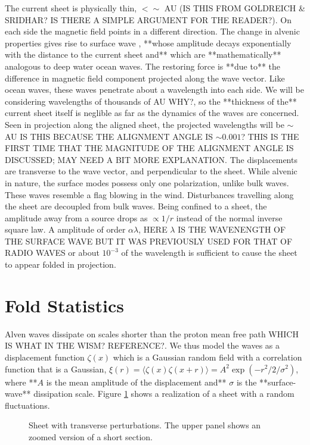 \documentclass[useAMS,usenatbib]{mn2e}
\begin{document}
The current sheet is physically thin, $< \sim $ AU (IS THIS FROM GOLDREICH \& SRIDHAR?
IS THERE A SIMPLE ARGUMENT FOR THE READER?).  On each side the
magnetic field points in a different direction.  The change in alvenic
properties gives rise to surface
wave \citep{1991SoPh..133..263J, 2009GApFD.103...89J}, **whose amplitude
decays exponentially with the distance to the current sheet and** which are
**mathematically** analogous to deep water ocean waves.  The restoring force is **due to** the
difference in magnetic field component projected along the wave
vector.  Like ocean waves, these waves penetrate about a wavelength
into each side.  We will be considering wavelengths of thousands of
AU WHY?, so the **thickness of the** current sheet itself is neglible as far as the dynamics of
the waves are concerned.  Seen in projection along the aligned sheet,
the projected wavelengths will be $\sim $ AU IS THIS BECAUSE THE ALIGNMENT ANGLE IS
$\sim 0.001$?  THIS IS THE FIRST TIME THAT THE MAGNITUDE OF THE ALIGNMENT ANGLE
IS DISCUSSED; MAY NEED A BIT MORE EXPLANATION.  The displacements are
transverse to the wave vector, and perpendicular to the sheet.  While
alvenic in nature, the surface modes possess only one polarization,
unlike bulk waves.  These waves resemble a flag blowing in the wind.
Disturbances travelling along the sheet are decoupled from bulk waves.
Being confined to a sheet, the amplitude away from a source drops as
$\propto 1/r$ instead of the normal inverse square law.  A amplitude
of order $\alpha \lambda$, HERE $\lambda$ IS THE WAVENENGTH OF THE SURFACE WAVE BUT
IT WAS PREVIOUSLY USED FOR THAT OF RADIO WAVES or about $10^{-3}$ of the wavelength is
sufficient to cause the sheet to appear folded in projection.

\section{Fold Statistics}

Alven waves dissipate on scales shorter than the proton mean free
path WHICH IS WHAT IN THE WISM? REFERENCE?.  We thus model the waves as a displacement function $\zeta(x)$
which is a Gaussian random field with a correlation function that is a
Gaussian, $\xi(r)=\langle \zeta(x)
\zeta(x+r)\rangle=A^2\exp(-r^2/2/\sigma^2)$, where **$A$ is the mean amplitude
of the displacement and** $\sigma$ is the **surface-wave**
dissipation scale.  Figure \ref{fig:sheet} shows a realization of a
sheet with a random fluctuations.

\begin{figure}
\centerline{}
\caption{Sheet with transverse perturbations.  The upper panel shows
  an zoomed version of a short section.}
\label{fig:sheet}
\end{figure}
\end{document}
